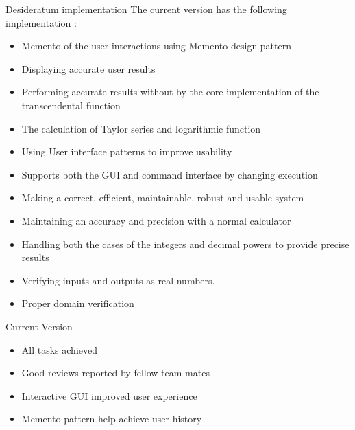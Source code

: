 \documentclass[final]{beamer}
\newlength{\onecolwid}
\begin{document}
\begin{frame}
\begin{columns}[t]
\begin{column}{\onecolwid}
\begin{exampleblock}{Desideratum implementation}
The current version has the following implementation : \\ 
\begin{itemize}

\item Memento of the user interactions using Memento design pattern
\item Displaying accurate user results
\item Performing accurate results without by the core implementation of the transcendental function
\item The calculation of Taylor series and logarithmic function
\item Using User interface patterns to improve usability
\item Supports both the GUI and command interface by changing execution 
\item Making a correct, efficient, maintainable, robust and usable system
\item Maintaining an accuracy and precision with a normal calculator
\item Handling both the cases of the integers and decimal powers to provide
precise results
\item Verifying inputs and outputs as real numbers.
\item Proper domain verification

\end{itemize}

\end{exampleblock}


\begin{exampleblock}{Current Version}
\begin{itemize}
    \item All tasks achieved 
    \item Good reviews reported by fellow team mates
    \item Interactive GUI improved user experience
    \item Memento pattern help achieve user history
\end{itemize}
\end{exampleblock}


\end{column} %


\end{columns}
\end{frame}
\end{document}
